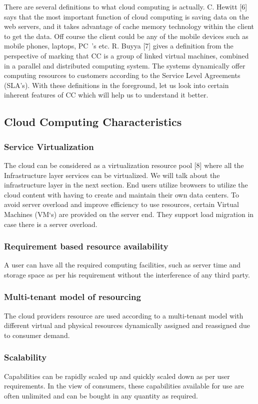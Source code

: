 \documentclass[10pt, conference, compsocconf]{IEEEtran}
\begin{document}
There are several definitions to what cloud computing is actually. C. Hewitt [6] says that the most important function of cloud computing is saving data on the web servers, and it takes advantage of cache memory technology within the client to get the data. Off course the client could be any of the mobile devices such as mobile phones, laptops, PC~’s etc. R. Buyya [7] gives a definition from the perspective of marking that CC is a group of linked virtual machines, combined in a parallel and distributed computing system. The systems dynamically offer computing resources to customers according to the Service Level Agreements (SLA’s). With these definitions in the foreground, let us look into certain inherent features of CC which will help us to understand it better.

\subsection{Cloud Computing Characteristics}
\subsubsection{Service Virtualization}
The cloud can be considered as a virtualization resource pool [8] where all the Infrastructure layer services can be virtualized. We will talk about the infrastructure layer in the next section. End users utilize browsers to utilize the cloud content with having to create and maintain their own data centers. To avoid server overload and improve efficiency to use resources, certain Virtual Machines (VM`s) are provided on the server end. They support load migration in case there is a server overload.
\subsubsection{Requirement based resource availability}
A user can have all the required computing facilities, such as server time and storage space as per his requirement without the interference of any third party.
\subsubsection{Multi-tenant model of resourcing}
The cloud providers resource are used according to a multi-tenant model with different virtual and physical resources dynamically assigned and reassigned due to consumer demand.
\subsubsection{Scalability}
Capabilities can be rapidly scaled up and quickly scaled down as per user requirements. In the view of consumers, these capabilities available for use are often unlimited and can be bought in any quantity as required.
\end{document}
